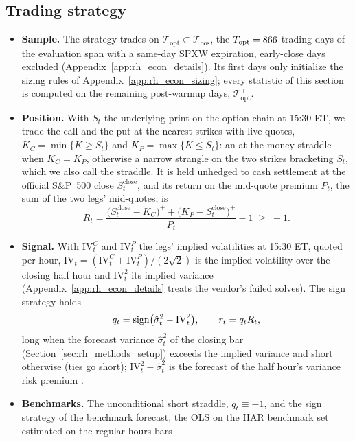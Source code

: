 \subsection{Trading strategy}
\label{sec:rh_econ_strategy}
\begin{itemize}
\item \textbf{Sample.} The strategy trades on $\mathcal T_{\mathrm{opt}} \subset \mathcal T_{\mathrm{oos}}$, the
  $T_{\mathrm{opt}} = 866$ trading days of the evaluation span with a same-day SPXW expiration, early-close days
  excluded (Appendix~\ref{app:rh_econ_details}). Its first \rheSzWarmup{} days only initialize the sizing rules of
  Appendix~\ref{app:rh_econ_sizing}; every statistic of this section is computed on the remaining \rheSzDays{}
  post-warmup days, $\mathcal T_{\mathrm{opt}}^{+}$.
\item \textbf{Position.} With $S_t$ the underlying print on the option chain at 15:30 ET, we trade the call and the
  put at the nearest strikes with live quotes, $K_C = \min\{K \ge S_t\}$ and $K_P = \max\{K \le S_t\}$: an
  at-the-money straddle when $K_C = K_P$, otherwise a narrow strangle on the two strikes bracketing $S_t$, which we
  also call the straddle. It is held unhedged to cash settlement at the official S\&P~500 close
  $S^{\mathrm{close}}_t$, and its return on the mid-quote premium $P_t$, the sum of the two legs' mid-quotes, is
  \[
    R_t = \frac{\bigl(S^{\mathrm{close}}_t - K_C\bigr)^+ + \bigl(K_P - S^{\mathrm{close}}_t\bigr)^+}{P_t} - 1
      \;\ge\; -1 .
  \]
\item \textbf{Signal.} With $\mathrm{IV}^C_t$ and $\mathrm{IV}^P_t$ the legs' implied volatilities at 15:30 ET, quoted
  per hour, $\mathrm{IV}_t = (\mathrm{IV}^C_t + \mathrm{IV}^P_t)/(2\sqrt2)$ is the implied volatility over the closing
  half hour and $\mathrm{IV}_t^2$ its implied variance (Appendix~\ref{app:rh_econ_details} treats the vendor's
  failed solves). The sign strategy holds
  \[
    q_t = \operatorname{sign}\bigl(\hat\sigma^2_t - \mathrm{IV}_t^2\bigr), \qquad r_t = q_t R_t ,
  \]
  long when the forecast variance $\hat\sigma^2_t$ of the closing bar (Section~\ref{sec:rh_methods_setup}) exceeds
  the implied variance and short otherwise (ties go short); $\mathrm{IV}_t^2 - \hat\sigma^2_t$ is the forecast of the
  half hour's variance risk premium \citep{CarrWu2009,BollerslevTauchenZhou2009}.
\item \textbf{Benchmarks.} The unconditional short straddle, $q_t \equiv -1$, and the sign strategy of the benchmark
  forecast, the OLS on the HAR benchmark set estimated on the \rhePoolNBars{} regular-hours bars

\end{itemize}
